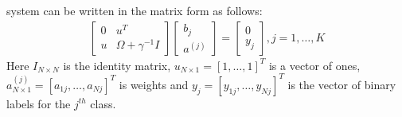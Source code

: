 \documentclass[conference]{IEEEtran}
\begin{document}
    system can be written in the matrix form as follows:
    \begin{align}
        \begin{bmatrix}
            0 & u^{T}                 \\
            u & \Omega + \gamma^{-1}I
        \end{bmatrix}
        \begin{bmatrix}
            b_{j} \\
            a^{(j)}
        \end{bmatrix}
        =
        \begin{bmatrix}
            0 \\
            y_{j}
        \end{bmatrix}
        , j = 1,\ldots,K
    \end{align}
    Here $I_{N \times N}$ is the identity matrix, $u_{N \times 1} = [1,\ldots,1]^{T}$ is a vector of ones,
    $a^{(j)}_{N \times 1} = [a_{1j}, \ldots, a_{Nj}]^{T}$ is weights and $y_{j} = [y_{1j}, \ldots, y_{Nj}]^{T}$ is the
    vector of binary labels for the $j^{th}$ class.
\end{document}
